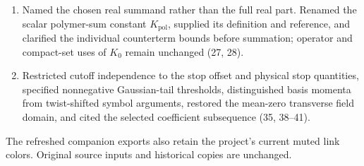 \documentclass[11pt,letterpaper,reqno]{amsart}
\begin{document}
\begin{enumerate}[label=\arabic*.,leftmargin=*,itemsep=4pt]
spectral projections in the finite-stage identity, and used absolute
coordinate differences for the positive displacement (23--25).
\item Named the chosen real summand rather than the full real part.
Renamed the scalar polymer-sum constant $K_{\mathrm{pol}}$, supplied its
definition and reference, and clarified the individual counterterm
bounds before summation; operator and compact-set uses of $K_0$ remain
unchanged (27, 28).
\item Restricted cutoff independence to the stop offset and physical
stop quantities, specified nonnegative Gaussian-tail thresholds,
distinguished basis momenta from twist-shifted symbol arguments, restored
the mean-zero transverse field domain, and cited the selected coefficient
subsequence (35, 38--41).
\end{enumerate}
The refreshed companion exports also retain the project's current muted
link colors. Original source inputs and historical copies are unchanged.
\end{document}
